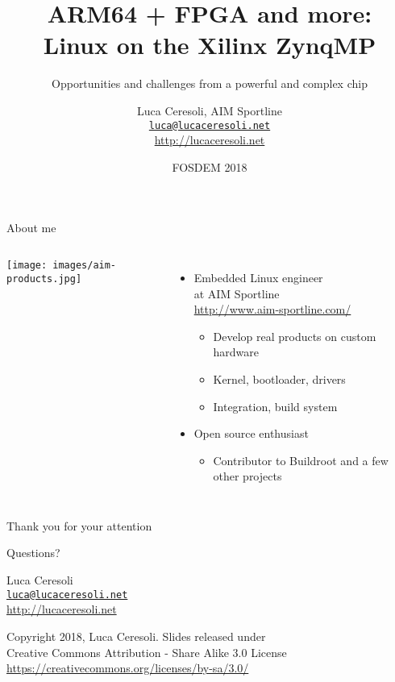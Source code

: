 \documentclass[xetex,table]{beamer}
\title{ARM64 + FPGA and more:\\Linux on the Xilinx ZynqMP}
\subtitle{Opportunities and challenges from a powerful and complex chip}
\author{Luca Ceresoli, AIM Sportline\\
  \href{mailto:luca@lucaceresoli.net}{\tt luca@lucaceresoli.net}\\
  \url{http://lucaceresoli.net}
}
\date{FOSDEM 2018}
\begin{document}
\maketitle

\begin{frame}{About me}
  \begin{columns}
    \texttt{[image: images/aim-products.jpg]}

    \begin{itemize}
    \item Embedded Linux engineer\\
      at AIM Sportline\\
      {\footnotesize\url{http://www.aim-sportline.com/}}
      \begin{itemize}
      \item Develop real products on custom hardware
      \item Kernel, bootloader, drivers
      \item Integration, build system
      \end{itemize}
    \item Open source enthusiast
      \begin{itemize}
      \item Contributor to Buildroot and a few other projects
      \end{itemize}
    \end{itemize}
  \end{columns}
\end{frame}

\begin{frame}
  \begin{center}
    Thank you for your attention

    \vspace{0.15\textheight}

    {\Huge Questions?}

    \vspace{0.15\textheight}

    {\Large Luca Ceresoli}\\
    \href{mailto:luca@lucaceresoli.net}{\tt luca@lucaceresoli.net}\\
    \url{http://lucaceresoli.net}

    \vspace{0.05\textheight}

    \tiny
    \textcopyright{} Copyright 2018, Luca Ceresoli.
    Slides released under\\
    Creative Commons Attribution - Share Alike 3.0 License \\
    \url{https://creativecommons.org/licenses/by-sa/3.0/} \\
  \end{center}
\end{frame}
\end{document}
